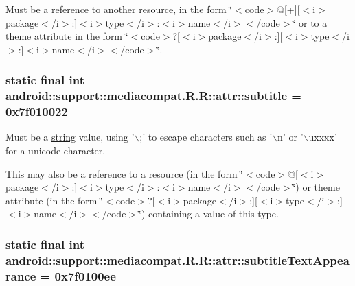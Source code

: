 Must be a reference to another resource, in the form \char`\"{}$<$code$>$@\mbox{[}+\mbox{]}\mbox{[}$<$i$>$package$<$/i$>$:\mbox{]}$<$i$>$type$<$/i$>$:$<$i$>$name$<$/i$>$$<$/code$>$\char`\"{} or to a theme attribute in the form \char`\"{}$<$code$>$?\mbox{[}$<$i$>$package$<$/i$>$:\mbox{]}\mbox{[}$<$i$>$type$<$/i$>$:\mbox{]}$<$i$>$name$<$/i$>$$<$/code$>$\char`\"{}. \hypertarget{classandroid_1_1support_1_1mediacompat_1_1_r_1_1attr_d3b42961b36ff2507ace8103d07f7709}{
\subsubsection[{subtitle}]{\setlength{\rightskip}{0pt plus 5cm}static final int android::support::mediacompat.R.R::attr::subtitle = 0x7f010022}}
\label{classandroid_1_1support_1_1mediacompat_1_1_r_1_1attr_d3b42961b36ff2507ace8103d07f7709}


Must be a \hyperlink{classandroid_1_1support_1_1mediacompat_1_1_r_1_1string}{string} value, using '$\backslash$;' to escape characters such as '$\backslash$n' or '$\backslash$uxxxx' for a unicode character. 

This may also be a reference to a resource (in the form \char`\"{}$<$code$>$@\mbox{[}$<$i$>$package$<$/i$>$:\mbox{]}$<$i$>$type$<$/i$>$:$<$i$>$name$<$/i$>$$<$/code$>$\char`\"{}) or theme attribute (in the form \char`\"{}$<$code$>$?\mbox{[}$<$i$>$package$<$/i$>$:\mbox{]}\mbox{[}$<$i$>$type$<$/i$>$:\mbox{]}$<$i$>$name$<$/i$>$$<$/code$>$\char`\"{}) containing a value of this type. \hypertarget{classandroid_1_1support_1_1mediacompat_1_1_r_1_1attr_67d49de1687f554f362771806c5bd3fd}{
\subsubsection[{subtitleTextAppearance}]{\setlength{\rightskip}{0pt plus 5cm}static final int android::support::mediacompat.R.R::attr::subtitleTextAppearance = 0x7f0100ee}}
\label{classandroid_1_1support_1_1mediacompat_1_1_r_1_1attr_67d49de1687f554f362771806c5bd3fd}



